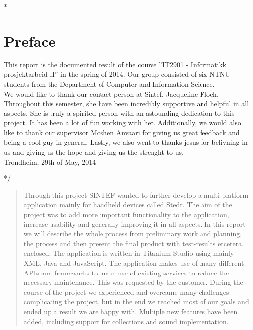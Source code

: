 \documentclass[12pt,a4paper,titlepage]{article}
\makeatletter
\newcommand\Signature[7]{\par\bigskip
  \setlength\tabcolsep{0pt}
  \begin{tabular}{@{\hspace{.05\textwidth}}>{\centering\arraybackslash}p{.4\textwidth}
      @{\hspace*{.1\textwidth}}>{\centering\arraybackslash}p{.4\textwidth}@{\hspace{.05\textwidth}}}
  \multicolumn{2}{c}{#1, \today} \\[10ex]
  \rule{.4\textwidth}{0.4pt} & \rule{.4\textwidth}{0.4pt} \\
  #2 & #3 \\[10ex]
  \rule{.4\textwidth}{0.4pt} & \rule{.4\textwidth}{0.4pt} \\
  #4 & #5 \\[10ex]
  \rule{.4\textwidth}{0.4pt} & \rule{.4\textwidth}{0.4pt} \\
  #6 & #7 \\[10ex]
\end{tabular}
\par
}
\makeatother
\begin{document}


\/*

\section*{Preface}
\thispagestyle{empty}

This report is the documented result of the course ”IT2901 - Informatikk prosjektarbeid II” in the spring of 2014. Our group consisted of six NTNU students from the Department of Computer and Information Science.
\\
We would like to thank our contact person at Sintef, Jacqueline Floch. Throughout this semester, she have been incredibly supportive and helpful in all aspects. She is truly a spirited person with an astounding dedication to this project. It has been a lot of fun working with her. Additionally, we would also like to thank our supervisor Moshen Anvaari for giving us great feedback and being a cool guy in general. Lastly, we also went to thanks jesus for belivning in us and giving us the hope and giving us the strenght to us.
\\
Trondheim, 29th of May, 2014


\cleardoublepage

*/

\begin{abstract}
Through this project SINTEF wanted to further develop a multi-platform application mainly for handheld devices called Stedr. The aim of the project was to add more important functionality to the application, increase usability and generally improving it in all aspects. In this report we will describe the whole process from preliminary work and planning, the process and then present the final product with test-results etcetera. enclosed. The application is written in Titanium Studio using mainly XML, Java and JavaScript. The application makes use of many different APIs and frameworks to make use of existing services to reduce the necessary maintenance. This was requested by the customer.
During the course of the project we experienced and overcame many challenges complicating the project, but in the end we reached most of our goals and ended up a result we are happy with. Multiple new features have been added, including support for collections and sound implementation.
\end{abstract}
\end{document}
